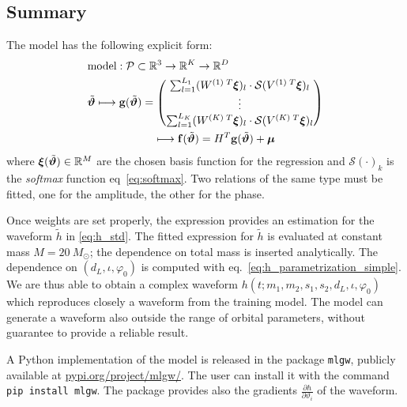 \subsection{Summary}
The model has the following explicit form:
\begin{align}
	& \textrm{model}: \mathcal{P} \subset \mathbb{R}^3 \rightarrow \mathbb{R}^K \rightarrow \mathbb{R}^D \nonumber\\
	& {\tilde{\boldsymbol{\vartheta}}}
	\longmapsto  \mathbf{g}({\tilde{\boldsymbol{\vartheta}}} ) = 
		\begin{pmatrix}
		\sum_{l=1}^{L_1} (W^{(1)\;T} \boldsymbol{\xi})_l \cdot \mathcal{S}(V^{(1)\;T}\boldsymbol{\xi})_l \\
		\vdots \\
		\sum_{l=1}^{L_K}  (W^{(K)\;T} \boldsymbol{\xi})_l \cdot \mathcal{S}(V^{(K)\;T}\boldsymbol{\xi})_l
		\end{pmatrix}
	\nonumber \\	
	& \qquad \qquad \qquad \longmapsto \mathbf{f}({\tilde{\boldsymbol{\vartheta}}} ) = H^T \mathbf{g}({\tilde{\boldsymbol{\vartheta}}} ) + \boldsymbol{\mu} \label{eq:model}
\end{align}
where ${\boldsymbol{\xi}}({\tilde{\boldsymbol{\vartheta}}}) \in \mathbb{R}^M $ are the chosen basis function for the regression and $\mathcal{S}(\cdot)_k$ is the \textit{softmax} function eq~\eqref{eq:softmax}.
Two relations of the same type must be fitted, one for the amplitude, the other for the phase.
\par
Once weights are set properly, the expression provides an estimation for the waveform $\tilde{h}$ in \eqref{eq:h_std}.
The fitted expression for  $\tilde{h}$ is evaluated at constant mass $M = \SI{20}{M_\odot}$; the dependence on total mass is inserted analytically.
The dependence on $(d_L, \iota, \varphi_0)$ is computed with eq.~\eqref{eq:h_parametrization_simple}.
We are thus able to obtain a complex waveform $h(t;m_1,m_2, s_1, s_2, d_L, \iota, \varphi_0)$ which reproduces closely a waveform from the training model.
The model can generate a waveform also outside the range of orbital parameters, without guarantee to provide a reliable result.
\par
A Python implementation of the model is released in the package \texttt{mlgw}, publicly available at \href{https://pypi.org/project/mlgw/}{pypi.org/project/mlgw/}. The user can install it with the command \texttt{pip install mlgw}. The package provides also the gradients $\frac{\partial h}{\partial \vartheta_i}$ of the waveform.

